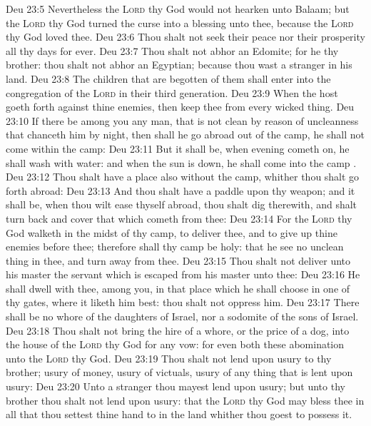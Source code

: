 \vs Deu 23:5 Nevertheless the \textsc{Lord} thy God would not hearken unto Balaam; but the \textsc{Lord} thy God turned the curse into a blessing unto thee, because the \textsc{Lord} thy God loved thee.
\vs Deu 23:6 Thou shalt not seek their peace nor their prosperity all thy days for ever.
\vs Deu 23:7 Thou shalt not abhor an Edomite; for he  thy brother: thou shalt not abhor an Egyptian; because thou wast a stranger in his land.
\vs Deu 23:8 The children that are begotten of them shall enter into the congregation of the \textsc{Lord} in their third generation.
\vs Deu 23:9 When the host goeth forth against thine enemies, then keep thee from every wicked thing.
\vs Deu 23:10 If there be among you any man, that is not clean by reason of uncleanness that chanceth him by night, then shall he go abroad out of the camp, he shall not come within the camp:
\vs Deu 23:11 But it shall be, when evening cometh on, he shall wash  with water: and when the sun is down, he shall come into the camp .
\vs Deu 23:12 Thou shalt have a place also without the camp, whither thou shalt go forth abroad:
\vs Deu 23:13 And thou shalt have a paddle upon thy weapon; and it shall be, when thou wilt ease thyself abroad, thou shalt dig therewith, and shalt turn back and cover that which cometh from thee:
\vs Deu 23:14 For the \textsc{Lord} thy God walketh in the midst of thy camp, to deliver thee, and to give up thine enemies before thee; therefore shall thy camp be holy: that he see no unclean thing in thee, and turn away from thee.
\vs Deu 23:15 Thou shalt not deliver unto his master the servant which is escaped from his master unto thee:
\vs Deu 23:16 He shall dwell with thee,  among you, in that place which he shall choose in one of thy gates, where it liketh him best: thou shalt not oppress him.
\vs Deu 23:17 There shall be no whore of the daughters of Israel, nor a sodomite of the sons of Israel.
\vs Deu 23:18 Thou shalt not bring the hire of a whore, or the price of a dog, into the house of the \textsc{Lord} thy God for any vow: for even both these  abomination unto the \textsc{Lord} thy God.
\vs Deu 23:19 Thou shalt not lend upon usury to thy brother; usury of money, usury of victuals, usury of any thing that is lent upon usury:
\vs Deu 23:20 Unto a stranger thou mayest lend upon usury; but unto thy brother thou shalt not lend upon usury: that the \textsc{Lord} thy God may bless thee in all that thou settest thine hand to in the land whither thou goest to possess it.
